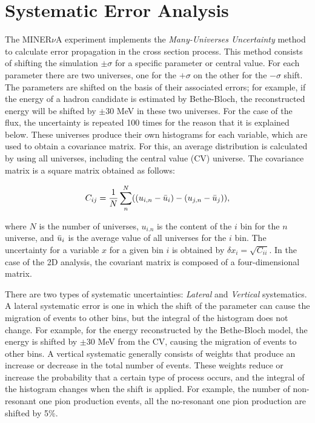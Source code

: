 \chapter{Systematic Error Analysis}
\minitoc
\label{Cap:ErrorAnalysis}

The MINER$\nu$A experiment implements the \textit{Many-Universes Uncertainty} method to calculate error propagation in the cross section process. This method consists of shifting the simulation $\pm\sigma$ for a specific parameter or central value. For each parameter there are two universes, one for the $+\sigma$ on the other for the $-\sigma$ shift. The parameters are shifted on the basis of their associated errors; for example, if the energy of a hadron candidate is estimated by Bethe-Bloch, the reconstructed energy will be shifted by $\pm30$ MeV in these two universes. For the case of the flux, the uncertainty is repeated 100 times for the reason that it is explained below. These universes produce their own histograms for each variable, which are used to obtain a covariance matrix. For this, an average distribution is calculated by using all universes, including the central value (CV) universe. The covariance matrix is a square matrix obtained as follows:

\begin{equation}
    C_{ij}=\frac{1}{N}\sum^N_n((u_{i,n}-\Bar{u}_{i})-(u_{j,n}-\Bar{u}_{j})),
    \label{eq:Systematics:CovMatrix}
\end{equation}

where $N$ is the number of universes, $u_{i.n}$ is the content of the $i$ bin for the $n$ universe, and $\Bar{u}_i$ is the average value of all universes for the $i$ bin. The uncertainty for a variable $x$ for a given bin $i$ is obtained by $\delta x_i=\sqrt{C_{ii}}$. In the case of the 2D analysis, the covariant matrix is composed of a four-dimensional matrix.

There are two types of systematic uncertainties: \textit{Lateral} and \textit{Vertical} systematics. A lateral systematic error is one in which the shift of the parameter can cause the migration of events to other bins, but the integral of the histogram does not change. For example, for the energy reconstructed by the Bethe-Bloch model, the energy is shifted by $\pm30$ MeV from the CV, causing the migration of events to other bins. A vertical systematic generally consists of weights that produce an increase or decrease in the total number of events. These weights reduce or increase the probability that a certain type of process occurs, and the integral of the histogram changes when the shift is applied. For example, the number of non-resonant one pion production events, all the no-resonant one pion production are shifted by 5\%. 

